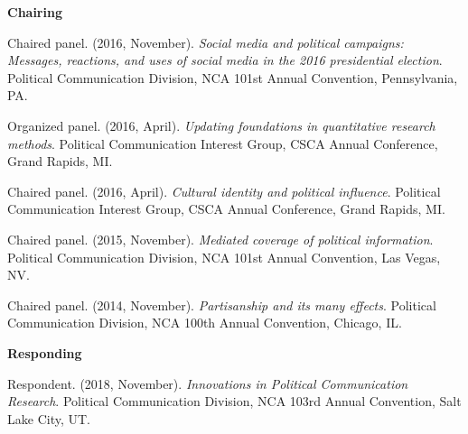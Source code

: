 {\large\textbf{Chairing}} \vspace{.5em}

  \begin{bibenum}
    \item[] Chaired panel. (2016, November).
      \textit{Social media and political campaigns: Messages, reactions, and uses of social media in the 2016 presidential election}.
      Political Communication Division, NCA 101st Annual Convention, Pennsylvania, PA.

    \item[] Organized panel. (2016, April).
      \textit{Updating foundations in quantitative research methods}.
      Political Communication Interest Group, CSCA Annual Conference, Grand Rapids, MI.

    \item[] Chaired panel. (2016, April).
      \textit{Cultural identity and political influence}.
      Political Communication Interest Group, CSCA Annual Conference, Grand Rapids, MI.

    \item[] Chaired panel. (2015, November).
      \textit{Mediated coverage of political information}.
      Political Communication Division, NCA 101st Annual Convention, Las Vegas, NV.

    \item[] Chaired panel. (2014, November).
      \textit{Partisanship and its many effects}.
      Political Communication Division, NCA 100th Annual Convention, Chicago, IL.
  \end{bibenum}

\vspace{1.5em}


{\large\textbf{Responding}} \vspace{.5em}

  \begin{bibenum}
    \item[] Respondent. (2018, November).
      \textit{Innovations in Political Communication Research}.
      Political Communication Division, NCA 103rd Annual Convention, Salt Lake City, UT.

  \end{bibenum}

\vspace{1em}
